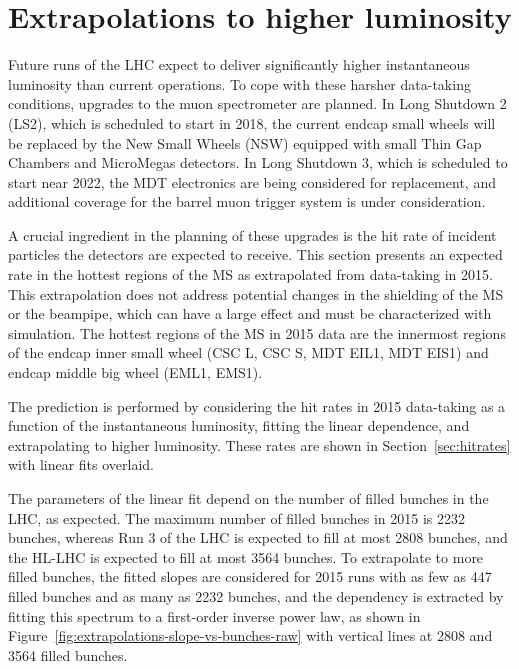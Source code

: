 \section{Extrapolations to higher luminosity}
\label{sec:extrapolations}

Future runs of the LHC expect to deliver significantly higher instantaneous luminosity than current operations. To cope with these harsher data-taking conditions, upgrades to the muon spectrometer are planned. In Long Shutdown 2 (LS2), which is scheduled to start in 2018, the current endcap small wheels will be replaced by the New Small Wheels (NSW) equipped with small Thin Gap Chambers and MicroMegas detectors. In Long Shutdown 3, which is scheduled to start near 2022, the MDT electronics are being considered for replacement, and additional coverage for the barrel muon trigger system is under consideration.

A crucial ingredient in the planning of these upgrades is the hit rate of incident particles the detectors are expected to receive. This section presents an expected rate in the hottest regions of the MS as extrapolated from data-taking in 2015. This extrapolation does not address potential changes in the shielding of the MS or the beampipe, which can have a large effect and must be characterized with simulation. The hottest regions of the MS in 2015 data are the innermost regions of the endcap inner small wheel (CSC L, CSC S, MDT EIL1, MDT EIS1) and endcap middle big wheel (EML1, EMS1).

The prediction is performed by considering the hit rates in 2015 data-taking as a function of the instantaneous luminosity, fitting the linear dependence, and extrapolating to higher luminosity. These rates are shown in Section~\ref{sec:hitrates} with linear fits overlaid.

The parameters of the linear fit depend on the number of filled bunches in the LHC, as expected. The maximum number of filled bunches in 2015 is 2232 bunches, whereas Run 3 of the LHC is expected to fill at most 2808 bunches, and the HL-LHC is expected to fill at most 3564 bunches. To extrapolate to more filled bunches, the fitted slopes are considered for 2015 runs with as few as 447 filled bunches and as many as 2232 bunches, and the dependency is extracted by fitting this spectrum to a first-order inverse power law, as shown in Figure~\ref{fig:extrapolations-slope-vs-bunches-raw} with vertical lines at 2808 and 3564 filled bunches. 

